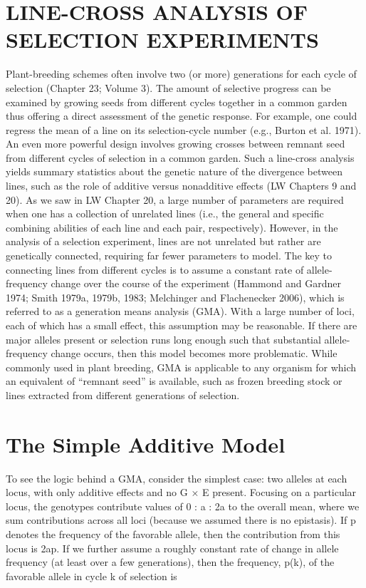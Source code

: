 \documentclass{article}
\begin{document}
\section{LINE-CROSS ANALYSIS OF SELECTION EXPERIMENTS}
Plant-breeding schemes often involve two (or more) generations for each cycle of selection (Chapter 23; Volume 3). The amount of selective progress can be examined by growing seeds from different cycles together in a common garden thus offering a direct assessment of the genetic response. For example, one could regress the mean of a line on its selection-cycle number (e.g., Burton et al. 1971). An even more powerful design involves growing crosses between remnant seed from different cycles of selection in a common garden. Such a line-cross analysis yields summary statistics about the genetic nature of the divergence between lines, such as the role of additive versus nonadditive effects (LW Chapters 9 and 20). As we saw in LW Chapter 20, a large number of parameters are required when one has a collection of unrelated lines (i.e., the general and specific combining abilities of each line and each pair, respectively). However, in the analysis of a selection experiment, lines are not unrelated but rather are genetically connected, requiring far fewer parameters to model. The key to connecting lines from different cycles is to assume a constant rate of allele-frequency change over the course of the experiment (Hammond and Gardner 1974; Smith 1979a, 1979b, 1983; Melchinger and Flachenecker 2006), which is referred to as a generation means analysis (GMA). With a large number of loci, each of which has a small effect, this assumption may be reasonable. If there are major alleles present or selection runs long enough such that substantial allele-frequency change occurs, then this model becomes more problematic. While commonly used in plant breeding, GMA is applicable to any organism for which an equivalent of “remnant seed” is available, such as frozen breeding stock or lines extracted from different generations of selection.

\section{The Simple Additive Model}
To see the logic behind a GMA, consider the simplest case: two alleles at each locus, with only additive effects and no G × E present. Focusing on a particular locus, the genotypes contribute values of 0 : a : 2a to the overall mean, where we sum contributions across all loci (because we assumed there is no epistasis). If p denotes the frequency of the favorable allele, then the contribution from this locus is 2ap. If we further assume a roughly constant rate of change in allele frequency (at least over a few generations), then the frequency, p(k), of the favorable allele in cycle k of selection is
\end{document}
